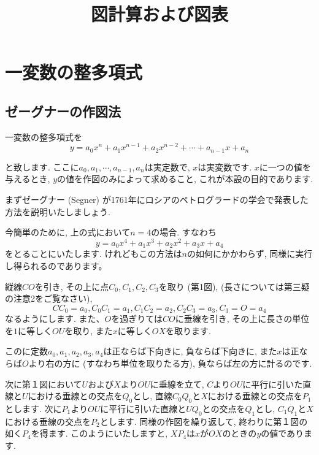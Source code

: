 \documentclass[11pt,a4paper]{jsarticle}
\title{図計算および図表}
\begin{document}
\maketitle



%
%
\section {一変数の整多項式}
\subsection {ゼーグナーの作図法}

一変数の整多項式を
\begin{equation}
y = a_0 x^n + a_1 x^{n-1} + a_2 x^{n-2} + \cdots + a_{n-1} x + a_n
\end{equation}

と致します. ここに$a_0, a_1, \cdots,a_{n-1},a_n$は実定数で, $x$は実変数です. $x$に一つの値を与えるとき, $y$の値を作図のみによって求めること, これが本設の目的であります. 

まずゼーグナー (Segner) が1761年にロシアのペトログラードの学会で発表した方法を説明いたしましょう. 

今簡単のために, 上の式において$n=4$の場合. すなわち
\begin{equation}
y = a_0x^4+a_1x^3+a_2x^2+a_3x+a_4
\end{equation}
をとることにいたします.
けれどもこの方法は$n$の如何にかかわらず, 同様に実行し得られるのであります。

縦線$CO$を引き, その上に点$C_0, C_1, C_2, C_3$を取り (第1図), (長さについては第三疑の注意2をご覧なさい), 
\begin{equation}
CC_0 = a_0, C_0C_1=a_1, C_1C_2=a_2, C_2C_3=a_3, C_3=O=a_4
\end{equation}
なるようにします. また、$O$を過ぎりては$CO$に垂線を引き, その上に長さの単位を$1$に等しく$OU$を取り, また$x$に等しく$OX$を取ります.

このに定数$a_0, a_1, a_2, a_3, a_4$は正ならば下向きに, 負ならば下向きに, また$x$は正ならば$O$より右の方に (すなわち単位を取りたる方), 負ならば左の方に計るのです.

次に第１図において$U$および$X$より$OU$に垂線を立て, $C$より$OU$に平行に引いた直線と$U$における垂線との交点を$Q_0$とし, 直線$C_0Q_0$と$X$における垂線との交点を$P_1$とします. 
次に$P_1$より$OU$に平行に引いた直線と$UQ_0$との交点を$Q_1$とし, $C_1Q_1$と$X$における垂線の交点を$P_2$とします. 同様の作図を繰り返して, 終わりに第１図の如く$P_4$を得ます. このようにいたしますと, $XP_4$は$x$が$OX$のときの$y$の値であります.
\end{document}
